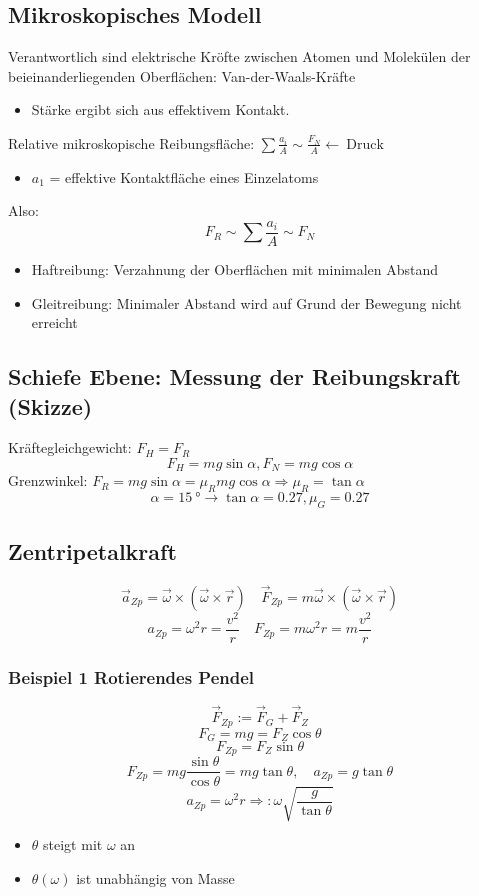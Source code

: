 \documentclass[a4paper]{scrartcl}
\renewcommand{\v}[1]{\vec{#1}}
\begin{document}
\subsection{Mikroskopisches Modell}
\label{sec-8-9}
Verantwortlich sind elektrische Kröfte zwischen Atomen und Molekülen der beieinanderliegenden Oberflächen: Van-der-Waals-Kräfte
\begin{itemize}
\item Stärke ergibt sich aus effektivem Kontakt.
\end{itemize}
Relative mikroskopische Reibungsfläche: $\sum \frac{a_i}{A} \sim \frac{F_N}{A} \leftarrow~\text{Druck}$
\begin{itemize}
\item $a_1$ = effektive Kontaktfläche eines Einzelatoms
\end{itemize}
Also: \[F_R \sim \sum \frac{a_i}{A} \sim F_N\]
\begin{itemize}
\item Haftreibung: Verzahnung der Oberflächen mit minimalen Abstand
\item Gleitreibung: Minimaler Abstand wird auf Grund der Bewegung nicht erreicht
\end{itemize}
\subsection{Schiefe Ebene: Messung der Reibungskraft (Skizze)}
\label{sec-8-10}
Kräftegleichgewicht: $F_H = F_R$
\[F_H = m g \sin{\alpha}, F_N = m g \cos{\alpha}\]
Grenzwinkel: $F_R = m g \sin{\alpha} = \mu_R m g \cos{\alpha} \Rightarrow \mu_R = \tan{\alpha}$
\[\alpha = \SI{15}{\degree} \rightarrow \tan{\alpha} = 0.27,\mu_G = 0.27\]
\subsection{Zentripetalkraft}
\label{sec-8-11}
\[\v a_{Zp} = \v \omega \times(\v\omega\times\v r)\quad \v{F}_{Zp} = m\v\omega\times(\v\omega\times\v r)\]
\[a_{Zp} = \omega^2 r = \frac{v^2}{r}\quad F_{Zp} = m\omega^2 r = m \frac{v^2}{r}\]
\subsubsection{Beispiel 1 Rotierendes Pendel}
\label{sec-8-11-1}
\[\v{F}_{Zp} := \v{F}_G + \v{F}_Z\]
\[F_G = m g = F_Z \cos{\theta}\]
\[F_{Zp} = F_Z \sin{\theta}\]
\[F_{Zp} = mg \frac{\sin{\theta}}{\cos{\theta}} = m g \tan{\theta},\quad a_{Zp} = g\tan{\theta}\]
\[a_{Zp} = \omega^2 r \Rightarrow: \omega \sqrt{\frac{g}{\tan{\theta}}}\]
\begin{itemize}
\item $\theta$ steigt mit $\omega$ an
\item $\theta(\omega)$ ist unabhängig von Masse
\end{itemize}
\end{document}
